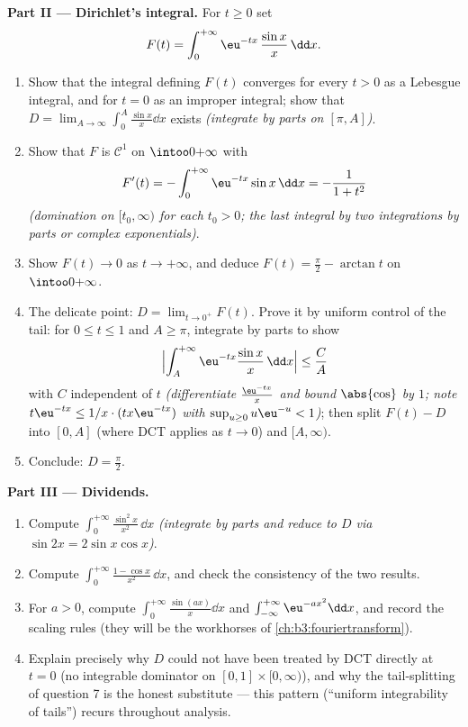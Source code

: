 \begin{problem}
\medskip
\noindent\textbf{Part II --- Dirichlet's integral.} For $t
\geq 0$ set
\[
F(t) = \int_0^{+\infty}\eu^{-tx}\,\frac{\sin x}{x}\,\dd x .
\]
\begin{enumerate}[resume]
  \item Show that the integral defining $F(t)$ converges for
        every $t > 0$ as a Lebesgue integral, and for $t = 0$
        as an improper integral; show that $D =
        \lim_{A\to\infty}\int_0^A\frac{\sin x}x\dd x$ exists
        \emph{(integrate by parts on $[\pi, A]$)}.
  \item Show that $F$ is $\mathcal C^1$ on
        $\intoo0{+\infty}$ with
        \[
        F'(t) = -\int_0^{+\infty}\eu^{-tx}\sin x\,\dd x
        = -\frac{1}{1 + t^2}
        \]
        \emph{(domination on $[t_0, \infty)$ for each $t_0 >
        0$; the last integral by two integrations by parts or
        complex exponentials)}.
  \item Show $F(t) \to 0$ as $t \to +\infty$, and deduce $F(t)
        = \frac\pi2 - \arctan t$ on $\intoo0{+\infty}$.
  \item The delicate point: $D = \lim_{t\to0^+}F(t)$. Prove it
        by uniform control of the tail: for $0 \leq t \leq 1$
        and $A \geq \pi$, integrate by parts to show
        \[
        \Bigl|\int_A^{+\infty}\eu^{-tx}\frac{\sin
        x}x\,\dd x\Bigr| \leq \frac{C}{A}
        \]
        with $C$ independent of $t$ \emph{(differentiate
        $\frac{\eu^{-tx}}x$ and bound $\abs{\cos}$ by $1$;
        note $t\eu^{-tx} \leq 1/x\cdot(tx\eu^{-tx})$ with
        $\sup_{u\geq0}u\eu^{-u} < 1$)}; then split $F(t) - D$
        into $[0, A]$ (where DCT applies as $t \to 0$) and
        $[A, \infty)$.
  \item Conclude: $D = \frac\pi2$.
\end{enumerate}

\medskip
\noindent\textbf{Part III --- Dividends.}
\begin{enumerate}[resume]
  \item Compute $\int_0^{+\infty}\frac{\sin^2x}{x^2}\,\dd x$
        \emph{(integrate by parts and reduce to $D$ via $\sin
        2x = 2\sin x\cos x$)}.
  \item Compute $\int_0^{+\infty}\frac{1 -
        \cos x}{x^2}\,\dd x$, and check the consistency of the
        two results.
  \item For $a > 0$, compute
        $\int_0^{+\infty}\frac{\sin(ax)}x\dd x$ and
        $\int_{-\infty}^{+\infty}\eu^{-ax^2}\dd x$, and record
        the scaling rules (they will be the workhorses of
        \cref{ch:b3:fouriertransform}).
  \item Explain precisely why $D$ could not have been treated
        by DCT directly at $t = 0$ (no integrable dominator on
        $[0,1]\times[0,\infty)$), and why the tail-splitting of
        question 7 is the honest substitute --- this pattern
        (``uniform integrability of tails'') recurs throughout
        analysis.
\end{enumerate}


\end{problem}
